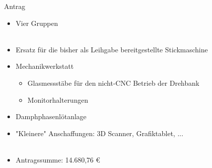\documentclass[t]{beamer}
\begin{document}
\begin{frame}{Antrag}
	\begin{itemize}
		\item Vier Gruppen\\~
		\item Ersatz für die bisher als Leihgabe bereitgestellte Stickmaschine
		\item Mechanikwerkstatt 
			\begin{itemize}
				\item Glasmessstäbe für den nicht-CNC Betrieb der Drehbank
				\item Monitorhalterungen 
			\end{itemize}
		\item Damphphasenlötanlage
		\item "Kleinere" Anschaffungen: 3D Scanner, Grafiktablet, ...\\~
		\item Antragssumme: 14.680,76 €
	\end{itemize}
\end{frame}
\end{document}

